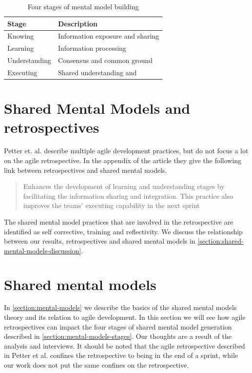 \begin{table}[!h]
	\begin{centering}
	\caption{Four stages of mental model building}
	\label{table:stages-mental-model}
	\begin{tabular}{l | p{}}

	\hline
	Stage & Description \\
	\hline
	Knowing &  Information exposure and sharing\\
	Learning & Information processing \\
	Understanding & Consensus and common ground \\
	Executing & Shared understanding and  \\
	\hline
	
\end{tabular}
\end{centering}
\end{table}

	
\section{Shared Mental Models and retrospectives}

Petter et. al. \cite{Petter2013} describe multiple agile development practices, but do not focus a lot on the agile retrospective. In the appendix of the article they give the following link between retrospectives and shared mental models.

\begin{quote}
Enhances the development of learning and understanding stages by facilitating the information sharing and integration. This practice also improves the teams’ executing capability in the next sprint
\end{quote}

The shared mental model practices that are involved in the retrospective are identified as self corrective, training and reflectivity. We discuss the relationship between our results, retrospectives and shared mental models in \autoref{section:shared-mental-models-discussion}.


\section{Shared mental models}
\label{section:shared-mental-models-discussion}
In \autoref{section:mental-models} we describe the basics of the shared mental models theory and its relation to agile development. In this section we will see how agile retrospectives can impact the four stages of shared mental model generation described in \autoref{section:mental-models-stages}. Our thoughts are a result of the analysis and interviews. It should be noted that the agile retrospective described in Petter et al. \cite{Petter2013} confines the retrospective to being in the end of a sprint, while our work does not put the same confines on the retrospective.

